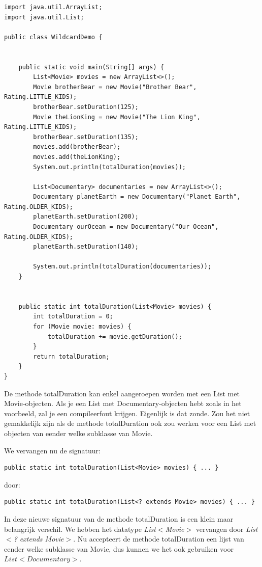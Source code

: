 \documentclass{tstextbook}
\begin{document}
\begin{lstlisting}
import java.util.ArrayList;
import java.util.List;

public class WildcardDemo {


	public static void main(String[] args) {
		List<Movie> movies = new ArrayList<>();
		Movie brotherBear = new Movie("Brother Bear", Rating.LITTLE_KIDS);
		brotherBear.setDuration(125);
		Movie theLionKing = new Movie("The Lion King", Rating.LITTLE_KIDS);
		brotherBear.setDuration(135);
		movies.add(brotherBear);
		movies.add(theLionKing);
		System.out.println(totalDuration(movies));

		List<Documentary> documentaries = new ArrayList<>();
		Documentary planetEarth = new Documentary("Planet Earth", Rating.OLDER_KIDS);
		planetEarth.setDuration(200);
		Documentary ourOcean = new Documentary("Our Ocean", Rating.OLDER_KIDS);
		planetEarth.setDuration(140);
		
		System.out.println(totalDuration(documentaries));
	}


	public static int totalDuration(List<Movie> movies) {
		int totalDuration = 0;
		for (Movie movie: movies) {
			totalDuration += movie.getDuration();
		}
		return totalDuration;
	}
}
\end{lstlisting}

De methode totalDuration kan enkel aangeroepen worden met een List met Movie-objecten. Als je een List met Documentary-objecten hebt zoals in het voorbeeld, zal je een compileerfout krijgen. Eigenlijk is dat zonde. Zou het niet gemakkelijk zijn als de methode totalDuration ook zou werken voor een List met objecten van eender welke subklasse van Movie.

We vervangen nu de signatuur:
\begin{lstlisting}
public static int totalDuration(List<Movie> movies) { ... }
\end{lstlisting}

door: 

\begin{lstlisting}
public static int totalDuration(List<? extends Movie> movies) { ... }
\end{lstlisting}

In deze nieuwe signatuur van de methode totalDuration is een klein maar belangrijk verschil. We hebben het datatype \textit{List$<$Movie$>$} vervangen door \textit{List$<$? extends Movie$>$}. Nu accepteert de methode totalDuration een lijst van eender welke subklasse van Movie, dus kunnen we het ook gebruiken voor $List<Documentary>$. 
\end{document}
